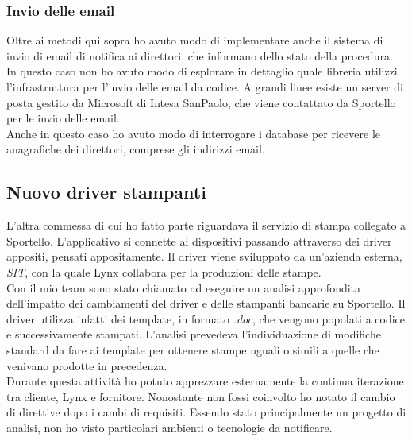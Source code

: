 \subsubsection{Invio delle email}
Oltre ai metodi qui sopra ho avuto modo di implementare anche il sistema di invio di email di notifica ai direttori, che informano dello stato della procedura. \\
In questo caso non ho avuto modo di esplorare in dettaglio quale libreria utilizzi l'infrastruttura per l'invio delle email da codice. A grandi linee esiste un server di posta gestito da Microsoft di Intesa SanPaolo, che viene contattato da Sportello per le invio delle email. \\
Anche in questo caso ho avuto modo di interrogare i database per ricevere le anagrafiche dei direttori, comprese gli indirizzi email. 

\subsection{Nuovo driver stampanti}
L'altra commessa di cui ho fatto parte riguardava il servizio di stampa collegato a Sportello. L'applicativo si connette ai dispositivi passando attraverso dei driver appositi, pensati appositamente. Il driver viene sviluppato da un'azienda esterna, \textit{SIT}, con la quale Lynx collabora per la produzioni delle stampe. \\
Con il mio team sono stato chiamato ad eseguire un analisi approfondita dell'impatto dei cambiamenti del driver e delle stampanti bancarie su Sportello. Il driver utilizza infatti dei template, in formato \textit{.doc}, che vengono popolati a codice e successivamente stampati. L'analisi prevedeva l'individuazione di modifiche standard da fare ai template per ottenere stampe uguali o simili a quelle che venivano prodotte in precedenza. \\
Durante questa attività ho potuto apprezzare esternamente la continua iterazione tra cliente, Lynx e fornitore. Nonostante non fossi coinvolto ho notato il cambio di direttive dopo i cambi di requisiti. Essendo stato principalmente un progetto di analisi, non ho visto particolari ambienti o tecnologie da notificare. 